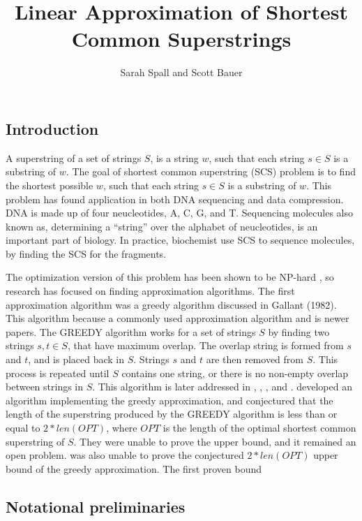 \documentclass[letterpaper,11pt,titlepage]{article}
\title{Linear Approximation of Shortest Common Superstrings}
\author[1]{Sarah Spall and Scott Bauer}
\begin{document}
\maketitle
\newpage

\subsection*{Introduction}
A superstring of a set of strings $S$, is a string $w$, such that each string $s \in S$ is a substring
of $w$.  The goal of shortest common superstring (SCS) problem is to find the shortest possible $w$, such that each 
string $s \in S$ is a substring of $w$. This problem has found application in both DNA sequencing 
and data compression.  DNA is made up of four neucleotides, {A, C, G, and T}.  Sequencing molecules also known as,
determining a ``string'' over the alphabet of neucleotides, is an important part of biology. In practice, biochemist use SCS to sequence molecules, by finding the SCS for the fragments.

The optimization version of this problem has been shown to be NP-hard \cite{blum1991linear} \cite{gallant1980}, 
so research has focused on finding approximation algorithms.  The first approximation 
algorithm was a greedy algorithm discussed in Gallant (1982). This algorithm because a commonly used approximation algorithm and is newer papers.  The GREEDY algorithm works for a set of strings $S$ by finding two strings $s,t \in S$, that have maximum overlap.  The overlap string is formed from $s$ and $t$, and  is placed back in $S$.  Strings $s$ and $t$ are then removed from $S$.  This process is repeated until
$S$ contains one string, or there is no non-empty overlap between strings in $S$.  This algorithm is later
addressed in \cite{turner1989approximation}, \cite{tarhio1988greedy}, \cite{li1990towards}, and \cite{blum1991linear}.
\cite{tarhio1988greedy} developed an algorithm implementing the greedy approximation, and conjectured that 
the length of the superstring produced by the GREEDY algorithm is less than or equal to $2*len(OPT)$, where $OPT$ is the length of the optimal shortest common superstring of $S$.  They were unable
to prove the upper bound, and it remained an open problem.  \cite{turner1989approximation} was also unable to prove
the conjectured $2*len(OPT)$ upper bound of the greedy approximation.  The first proven bound 

\subsection*{Notational preliminaries}
\end{document}
